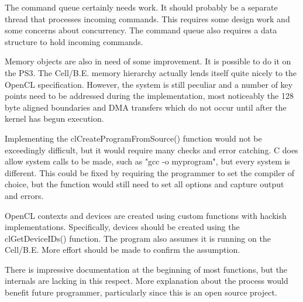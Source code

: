 The command queue certainly needs work. It should probably be a separate thread that processes incoming commands. This requires some design work and some concerns about concurrency. The command queue also requires a data structure to hold incoming commands.

Memory objects are also in need of some improvement. It is possible to do it on the PS3. The Cell/B.E. memory hierarchy actually lends itself quite nicely to the OpenCL specification. However, the system is still peculiar and a number of key points need to be addressed during the implementation, most noticeably the 128 byte aligned boundaries and DMA transfers which do not occur until after the kernel has begun execution.

Implementing the clCreateProgramFromSource() function would not be exceedingly difficult, but it would require many checks and error catching. C does allow system calls to be made, such as "gcc -o myprogram", but every system is different. This could be fixed by requiring the programmer to set the compiler of choice, but the function would still need to set all options and capture output and errors.

OpenCL contexts and devices are created using custom functions with hackish implementations. Specifically, devices should be created using the clGetDeviceIDs() function. The program also assumes it is running on the Cell/B.E. More effort should be made to confirm the assumption.

There is impressive documentation at the beginning of most functions, but the internals are lacking in this respect. More explanation about the process would benefit future programmer, particularly since this is an open source project.
